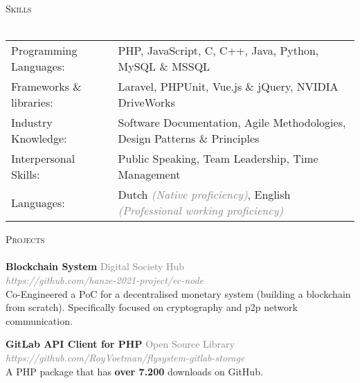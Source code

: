 \documentclass[a4paper]{article}
\newcommand{\lineunder} {
    \vspace*{-8pt} \\
    \hspace*{-18pt} \hrulefill \\
}
\newcommand{\header} [1] {
    {\hspace*{-18pt}\vspace*{6pt} \textsc{#1}}
    \vspace*{-6pt} \lineunder
}
\begin{document}
\vspace{5mm}

\header{Skills}
\vspace{2mm}
\begin{tabular}{l l}

	Programming Languages:   & PHP, JavaScript, C, C++, Java, Python, MySQL \& MSSQL
	\vspace{1mm}\\
	
    Frameworks \& libraries: & Laravel, PHPUnit, Vue.js \& jQuery, NVIDIA DriveWorks
    \vspace{1mm}\\
    
	Industry Knowledge:      & Software Documentation, Agile Methodologies, Design Patterns \& Principles
	\vspace{1mm}\\
	
	Interpersonal Skills:    & Public Speaking, Team Leadership, Time Management
	\vspace{1mm}\\
	
    Languages:               & Dutch \textcolor{gray}{\emph{(Native proficiency)}}, English \textcolor{gray}{\emph{(Professional working proficiency)}}\\
    
\end{tabular}
\vspace{2mm}

\vspace{5mm}

\header{Projects}
{\textbf{Blockchain System}} \hfill \textcolor{gray}{Digital Society Hub}\\
\textcolor{gray}{\emph{https://github.com/hanze-2021-project/ec-node}}\\
Co-Engineered a PoC for a decentralised monetary system (building a blockchain from scratch). Specifically focused on cryptography and p2p network communication.
\vspace*{2mm}

{\textbf{GitLab API Client for PHP}} \hfill \textcolor{gray}{Open Source Library}\\
\textcolor{gray}{\emph{https://github.com/RoyVoetman/flysystem-gitlab-storage}}\\
A PHP package that has \textbf{over 7.200} downloads on GitHub.
\vspace*{2mm}

\vspace{5mm}
\end{document}
